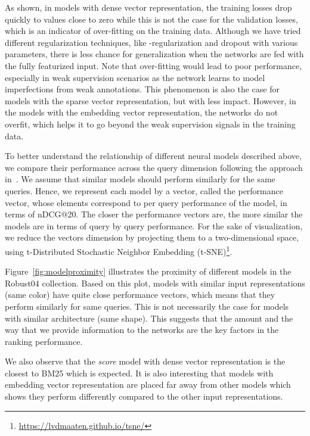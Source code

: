 \documentclass[sigconf]{acmart}
\newcommand{\modelone}{\textit{score} model\xspace}
\newcommand{\feedone}{dense vector representation\xspace}
\newcommand{\feedtwo}{sparse vector representation\xspace}
\newcommand{\feedthree}{embedding vector representation\xspace}
\begin{document}
As shown, in models with \feedone, the training losses drop quickly to values close to zero while this is not the case for the validation losses, which is an indicator of over-fitting on the training data. 
Although we have tried different regularization techniques, like -regularization and dropout with various parameters, there is less chance for generalization when the networks are fed with the fully featurized input. Note that over-fitting would lead to poor performance, especially in weak supervision scenarios as the network learns to model imperfections from weak annotations. 
This phenomenon is also the case for models with the \feedtwo, but with less impact. However, in the models with the \feedthree, the networks do not overfit, which helps it to go beyond the weak supervision signals in the training data.

To better understand the relationship of different neural models described above, we compare their performance across the query dimension following the approach in~\citep{Mitra:2016}. 
We assume that similar models should perform similarly for the same queries. Hence, we represent each model by a vector, called the performance vector, whose elements correspond to per query performance of the model, in terms of nDCG@20. The closer the performance vectors are, the more similar the models are in terms of query by query performance. For the sake of visualization, we reduce the vectors dimension by projecting them to a two-dimensional space, using t-Distributed Stochastic Neighbor Embedding (t-SNE)\footnote{\url{https://lvdmaaten.github.io/tsne/}}.

Figure~\ref{fig:modelproximity} illustrates the proximity of different models in the Robust04 collection. Based on this plot, models with similar input representations (same color) have quite close performance vectors, which means that they perform similarly for same queries. This is not necessarily the case for models with similar architecture (same shape). 
This suggests that the amount and the way that we provide information to the networks are the key factors in the ranking performance. 

We also observe that the \modelone with \feedone is the closest to BM25 which is expected. 
It is also interesting that models with \feedthree are placed far away from other models which shows they perform differently compared to the other input representations.
\end{document}
